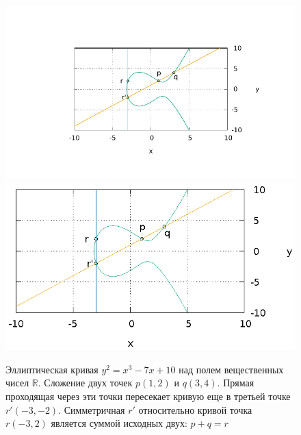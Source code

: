 \begin{figure}
\centering
\ifpdf
\includegraphics[angle=0,scale=1.5]
{./add/discretmath/picellipticsum.pdf}
\else
\includegraphics[angle=0,scale=1.5]
{./add/discretmath/picellipticsum.eps}
\fi
\caption{Эллиптическая кривая $y^2 = x^3 -7 x + 10$ над полем
  вещественных чисел $\mathbb{R}$. Сложение двух точек $p(1,2)$ и
  $q(3,4)$. Прямая проходящая через эти точки пересекает кривую еще в
  третьей точке $r'(-3,-2)$. Симметричная $r'$ относительно кривой
  точка $r(-3,2)$ является суммой исходных двух: $p + q = r$}
\label{fig:add:ellipticRsum}
\end{figure}
